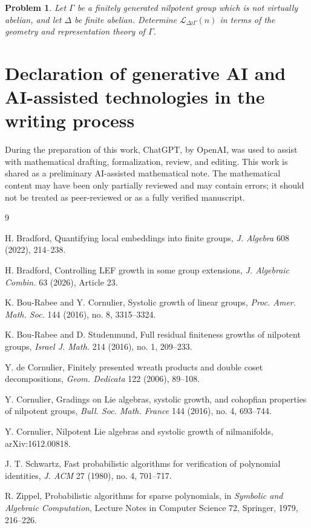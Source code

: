 \documentclass[11pt]{article}
\newcommand{\LEF}{\mathcal L}
\newtheorem{problem}[theorem]{Problem}
\begin{document}
\begin{problem}
Let \(\Gamma\) be a finitely generated nilpotent group which is not virtually abelian, and let \(\Delta\) be finite abelian. Determine \(\LEF_{\Delta\wr\Gamma}(n)\) in terms of the geometry and representation theory of \(\Gamma\).
\end{problem}

\section*{Declaration of generative AI and AI-assisted technologies in the writing process}

During the preparation of this work, ChatGPT, by OpenAI, was used to assist with mathematical drafting, formalization, review, and editing. This work is shared as a preliminary AI-assisted mathematical note. The mathematical content may have been only partially reviewed and may contain errors; it should not be treated as peer-reviewed or as a fully verified manuscript.

\begin{thebibliography}{9}

H. Bradford, Quantifying local embeddings into finite groups, \emph{J. Algebra} 608 (2022), 214--238.

H. Bradford, Controlling LEF growth in some group extensions, \emph{J. Algebraic Combin.} 63 (2026), Article 23.

K. Bou-Rabee and Y. Cornulier, Systolic growth of linear groups, \emph{Proc. Amer. Math. Soc.} 144 (2016), no. 8, 3315--3324.

K. Bou-Rabee and D. Studenmund, Full residual finiteness growths of nilpotent groups, \emph{Israel J. Math.} 214 (2016), no. 1, 209--233.

Y. de Cornulier, Finitely presented wreath products and double coset decompositions, \emph{Geom. Dedicata} 122 (2006), 89--108.

Y. Cornulier, Gradings on Lie algebras, systolic growth, and cohopfian properties of nilpotent groups, \emph{Bull. Soc. Math. France} 144 (2016), no. 4, 693--744.

Y. Cornulier, Nilpotent Lie algebras and systolic growth of nilmanifolds, arXiv:1612.00818.

J. T. Schwartz, Fast probabilistic algorithms for verification of polynomial identities, \emph{J. ACM} 27 (1980), no. 4, 701--717.

R. Zippel, Probabilistic algorithms for sparse polynomials, in \emph{Symbolic and Algebraic Computation}, Lecture Notes in Computer Science 72, Springer, 1979, 216--226.

\end{thebibliography}
\end{document}
